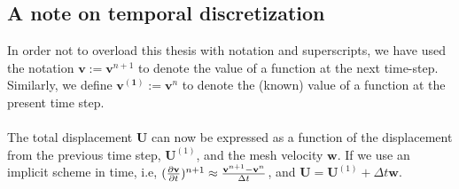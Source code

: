 \subsection{A note on temporal discretization}
In order not to overload this thesis with notation and superscripts, we have used the notation $\mathbf{v} := \mathbf{v}^{n+1}$ to denote the value of a function at the next time-step. Similarly, we define $\mathbf{v^{(1)}} := \mathbf{v}^n$ to denote the (known) value of a function at the present time step. 
\\
\\The total displacement $\mathbf{U}$ can now be expressed as a function of the displacement from the previous time step, $\mathbf{U}^{(1)}$, and the mesh velocity $\mathbf{w}$. If we use an implicit scheme in time, i.e, $(\frac{\partial \mathbf{v}}{\partial t})^{n+1} \approx \frac{\mathbf{v}^{n+1}-\mathbf{v}^{n}}{\Delta t} $, and $\mathbf{U} = \mathbf{U}^{(1)} + \Delta t \mathbf{w}$. 
\\
\\
